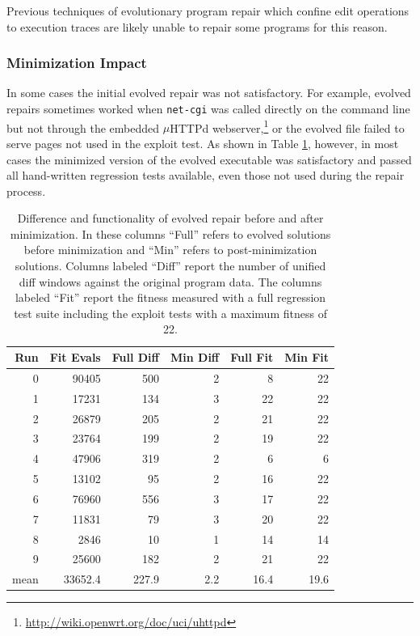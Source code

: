 \documentclass{sigcomm-alternate}
\begin{document}
{Previous techniques of evolutionary program repair which confine edit
operations to execution traces are likely unable to repair some
programs for this reason.

\subsubsection{Minimization Impact}
\label{minimization}

In some cases the initial evolved repair was not satisfactory.  For
example, evolved repairs sometimes worked when \texttt{net-cgi} was
called directly on the command line but not through the embedded
$\mu$HTTPd webserver,\footnote{\url{http://wiki.openwrt.org/doc/uci/uhttpd}}
or the evolved file failed to serve pages not used in the
exploit test.  As shown in Table \ref{minimized-stats}, however, in most
cases the minimized version of the evolved executable was satisfactory
and passed all hand-written regression tests available, even those not used
during the repair process. 

\begin{table}[htb]
\centering
\begin{tabular}{rrrrrr}
Run  & Fit Evals & Full Diff & Min Diff & Full Fit & Min Fit \\
\toprule
0    & 90405     & 500       & 2        & 8        & 22      \\
1    & 17231     & 134       & 3        & 22       & 22      \\
2    & 26879     & 205       & 2        & 21       & 22      \\
3    & 23764     & 199       & 2        & 19       & 22      \\
4    & 47906     & 319       & 2        & 6        & 6       \\
5    & 13102     & 95        & 2        & 16       & 22      \\
6    & 76960     & 556       & 3        & 17       & 22      \\
7    & 11831     & 79        & 3        & 20       & 22      \\
8    & 2846      & 10        & 1        & 14       & 14      \\
9    & 25600     & 182       & 2        & 21       & 22      \\
\bottomrule
mean & 33652.4   & 227.9     & 2.2      & 16.4     & 19.6    \\
\end{tabular}
\caption{\label{minimized-stats}Difference and functionality of
evolved repair before and after minimization.  In these columns ``Full''
refers to evolved solutions before minimization and ``Min'' refers to
post-minimization solutions.  Columns labeled ``Diff'' report the number
of unified diff windows against the original program data. The columns
labeled ``Fit'' report the fitness measured with a full regression test
suite including the exploit tests with a maximum fitness of 22.}
\end{table}

}
\end{document}
